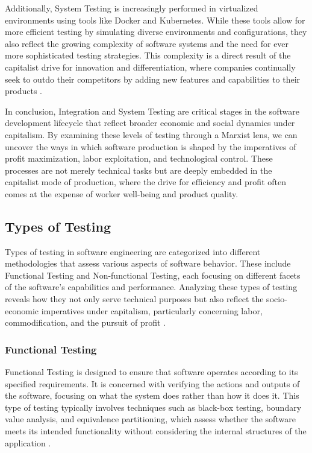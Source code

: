 \begin{refsection}
Additionally, System Testing is increasingly performed in virtualized environments using tools like Docker and Kubernetes. While these tools allow for more efficient testing by simulating diverse environments and configurations, they also reflect the growing complexity of software systems and the need for ever more sophisticated testing strategies. This complexity is a direct result of the capitalist drive for innovation and differentiation, where companies continually seek to outdo their competitors by adding new features and capabilities to their products \cite[pp.~250-255]{marx2008capital}.

In conclusion, Integration and System Testing are critical stages in the software development lifecycle that reflect broader economic and social dynamics under capitalism. By examining these levels of testing through a Marxist lens, we can uncover the ways in which software production is shaped by the imperatives of profit maximization, labor exploitation, and technological control. These processes are not merely technical tasks but are deeply embedded in the capitalist mode of production, where the drive for efficiency and profit often comes at the expense of worker well-being and product quality.

\subsection{Types of Testing}

Types of testing in software engineering are categorized into different methodologies that assess various aspects of software behavior. These include Functional Testing and Non-functional Testing, each focusing on different facets of the software's capabilities and performance. Analyzing these types of testing reveals how they not only serve technical purposes but also reflect the socio-economic imperatives under capitalism, particularly concerning labor, commodification, and the pursuit of profit \cite[pp.~37-42]{marx2008capital}.

\subsubsection{Functional Testing}

Functional Testing is designed to ensure that software operates according to its specified requirements. It is concerned with verifying the actions and outputs of the software, focusing on what the system does rather than how it does it. This type of testing typically involves techniques such as black-box testing, boundary value analysis, and equivalence partitioning, which assess whether the software meets its intended functionality without considering the internal structures of the application \cite[pp.~115-120]{myers2015art}.


\end{refsection}

